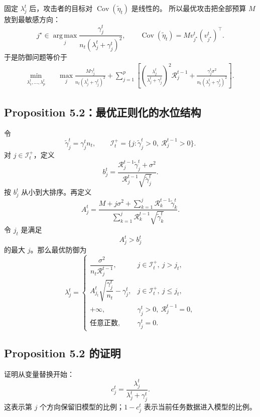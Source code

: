 \documentclass[UTF8,fontset=none,11pt]{ctexart}
\theoremstyle{cnstyle}
\newcommand{\Cov}{\operatorname{Cov}}
\newcommand{\argmax}{\operatorname*{arg\,max}}
\newcommand{\calR}{\mathcal{R}}
\newcommand{\calI}{\mathcal{I}}
\begin{document}
固定 \(\lambda_j^t\) 后，攻击者的目标对 \(\Cov(\tilde\eta_t)\) 是线性的。
所以最优攻击把全部预算 \(M\) 放到最敏感方向：
\[
  j^\star\in
  \argmax_j
  \frac{\gamma_j^t}{n_t(\lambda_j^t+\gamma_j^t)^2},
  \qquad
  \Cov(\tilde\eta_t)=Mv_{j^\star}^t(v_{j^\star}^t)^\top .
\]
于是防御问题等价于
\begin{align}
  \min_{\lambda_1^t,\dots,\lambda_p^t}\quad
  &
  \max_j
  \frac{M\gamma_j^t}{n_t(\lambda_j^t+\gamma_j^t)^2}
  +
  \sum_{j=1}^p
  \left[
  \left(\frac{\lambda_j^t}{\lambda_j^t+\gamma_j^t}\right)^2
  \calR_j^{t-1}
  +
  \frac{\gamma_j^t\sigma^2}{n_t(\lambda_j^t+\gamma_j^t)^2}
  \right].
  \label{eq:scalar-minimax}
\end{align}

\subsection{Proposition 5.2：最优正则化的水位结构}

令
\[
  \tilde\gamma_j^t=\gamma_j^tn_t,\qquad
  \calI_t^+=\{j:\tilde\gamma_j^t>0,\ \calR_j^{t-1}>0\}.
\]
对 \(j\in\calI_t^+\)，定义
\[
  b_j^t=
  \frac{\calR_j^{t-1}\tilde\gamma_j^t+\sigma^2}
  {\calR_j^{t-1}\sqrt{\tilde\gamma_j^t}} .
\]
按 \(b_j^t\) 从小到大排序。再定义
\[
  A_j^t=
  \frac{
  M+j\sigma^2+\sum_{k=1}^j\calR_k^{t-1}\tilde\gamma_k^t
  }{
  \sum_{k=1}^j\calR_k^{t-1}\sqrt{\tilde\gamma_k^t}
  } .
\]
令 \(j_t\) 是满足
\[
  A_j^t>b_j^t
\]
的最大 \(j\)。那么最优防御为
\begin{equation}
  \lambda_j^t=
  \begin{cases}
  \dfrac{\sigma^2}{n_t\calR_j^{t-1}},
  & j\in\calI_t^+,\ j>j_t,\\[0.9em]
  A_{j_t}^t\sqrt{\dfrac{\gamma_j^t}{n_t}}-\gamma_j^t,
  & j\in\calI_t^+,\ j\le j_t,\\[0.9em]
  +\infty,
  & \gamma_j^t>0,\ \calR_j^{t-1}=0,\\[0.4em]
  \text{任意正数},
  & \gamma_j^t=0 .
  \end{cases}
  \label{eq:rfd-lambda}
\end{equation}

\subsection{Proposition 5.2 的证明}

证明从变量替换开始：
\[
  c_j^t=\frac{\lambda_j^t}{\lambda_j^t+\gamma_j^t}.
\]
这表示第 \(j\) 个方向保留旧模型的比例；\(1-c_j^t\) 表示当前任务数据进入模型的比例。
\end{document}
